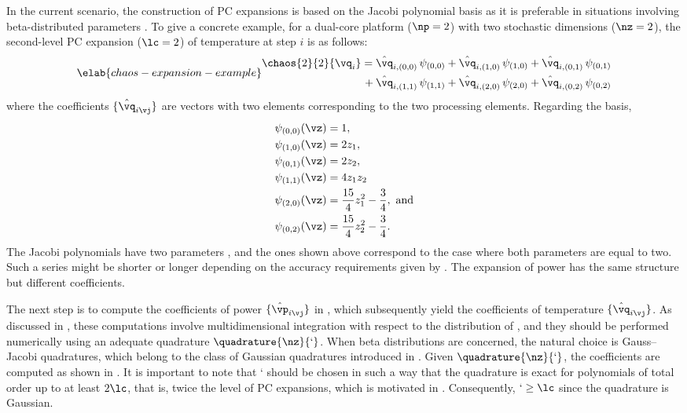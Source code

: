 In the current scenario, the construction of \ac{PC} expansions is based on the
Jacobi polynomial basis as it is preferable in situations involving
beta-distributed parameters \cite{xiu2010}. To give a concrete example, for a
dual-core platform ($\np = 2$) with two stochastic dimensions ($\nz = 2$), the
second-level \ac{PC} expansion ($\lc = 2$) of temperature at step $i$ is as
follows:
\begin{equation} \elab{chaos-expansion-example}
  \begin{split}
    \chaos{2}{2}{\vq_i}
    =    {} & \hat{\vq}_{i, (0, 0)} \, \psi_{(0, 0)} +
              \hat{\vq}_{i, (1, 0)} \, \psi_{(1, 0)} +
              \hat{\vq}_{i, (0, 1)} \, \psi_{(0, 1)} \\
    {} + {} & \hat{\vq}_{i, (1, 1)} \, \psi_{(1, 1)} +
              \hat{\vq}_{i, (2, 0)} \, \psi_{(2, 0)} +
              \hat{\vq}_{i, (0, 2)} \, \psi_{(0, 2)}
  \end{split}
\end{equation}
where the coefficients $\{ \hat{\vq}_{i \vj} \}$ are vectors with two elements
corresponding to the two processing elements. Regarding the basis,
\begin{align*}
  & \psi_{(0, 0)}(\vz) = 1, \\
  & \psi_{(1, 0)}(\vz) = 2 z_1, \\
  & \psi_{(0, 1)}(\vz) = 2 z_2, \\
  & \psi_{(1, 1)}(\vz) = 4 z_1 z_2 \\
  & \psi_{(2, 0)}(\vz) = \frac{15}{4} z_1^2 - \frac{3}{4}, \text{ and} \\
  & \psi_{(0, 2)}(\vz) = \frac{15}{4} z_2^2 - \frac{3}{4}.
\end{align*}
The Jacobi polynomials have two parameters \cite{xiu2010}, and the ones shown
above correspond to the case where both parameters are equal to two. Such a
series might be shorter or longer depending on the accuracy requirements given
by \lc. The expansion of power has the same structure but different
coefficients.

The next step is to compute the coefficients of power $\{ \hat{\vp}_{i \vj} \}$
in , which subsequently yield the coefficients of
temperature $\{ \hat{\vq}_{i \vj} \}$. As discussed in
, these computations involve multidimensional
integration with respect to the distribution of \vz, and they should be
performed numerically using an adequate quadrature $\quadrature{\nz}{\lq}$. When
beta distributions are concerned, the natural choice is Gauss--Jacobi
quadratures, which belong to the class of Gaussian quadratures introduced in
. Given $\quadrature{\nz}{\lq}$, the coefficients are
computed as shown in . It is important to note that \lq
should be chosen in such a way that the quadrature is exact for polynomials of
total order up to at least $2 \lc$, that is, twice the level of \ac{PC}
expansions, which is motivated in . Consequently, $\lq
\geq \lc$ since the quadrature is Gaussian.


